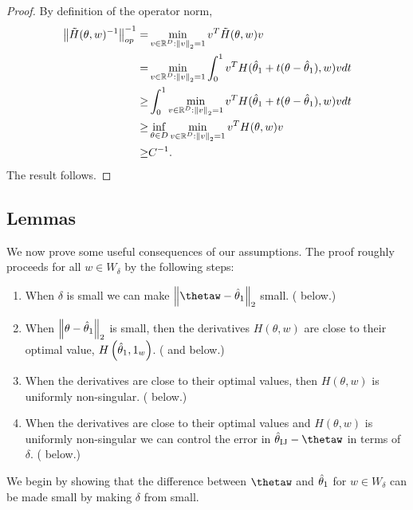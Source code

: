 \begin{proof}
%
By definition of the operator norm,
%
\begin{align*}
\left\Vert \tilde{H}(\theta, w)^{-1}\right\Vert_{op}^{-1} =&
    \min_{v \in \mathbb{R}^D: \left\Vert v\right\Vert_2 = 1} v^T \tilde{H}(\theta, w) v \\
=& \min_{v \in \mathbb{R}^D: \left\Vert v\right\Vert_2 = 1}
    \int_0^1 v^T H(\hat{\theta}_{1} + t (\theta - \hat{\theta}_{1}), w) v dt \\
\ge& \int_0^1 \min_{v \in \mathbb{R}^D: \left\Vert v\right\Vert_2 = 1}
    v^T H(\hat{\theta}_{1} + t (\theta - \hat{\theta}_{1}), w) v dt \\
\ge& \inf_{\theta \in D} \min_{v \in \mathbb{R}^D: \left\Vert v\right\Vert_2 = 1}
        v^T H(\theta, w) v \\
\ge& C^{-1}.
\end{align*}
%
The result follows.
%
\end{proof}






\subsection{Lemmas}

We now prove some useful consequences of our assumptions. The proof
roughly proceeds for all $w\in W_{\delta}$ by the following steps:
\begin{enumerate}
\item When $\delta$ is small we can make $\norm{{{\thetaw}}-\thetaone}_{2}$
small. ( below.)
\item When $\left\Vert \theta-\hat{\theta}_{1}\right\Vert_{2}$ is small, then the derivatives
$H\left(\theta,w\right)$ are close to their optimal value, $H\left(\hat{\theta}_{1},1_{w}\right)$.
( and 
below.)
\item When the derivatives are close to their optimal values, then $H\left(\theta,w\right)$
is uniformly non-singular. ( below.)
\item When the derivatives are close to their optimal values and $H\left(\theta,w\right)$
is uniformly non-singular we can control the error in $\thetaij-\thetaw$
in terms of $\delta$. ( below.)
\end{enumerate}
We begin by showing that the difference between $\thetaw$ and $\hat{\theta}_{1}$
for $w\in W_{\delta}$ can be made small by making $\delta$ from
 small.

